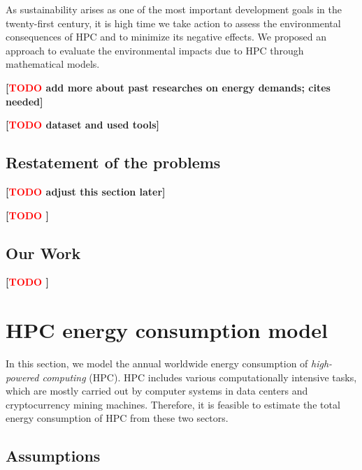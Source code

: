 \documentclass[12pt]{article}
\newcommand{\todo}[1]{\textbf{[\textcolor{red}{TODO} #1]}}
\begin{document}
As sustainability arises as one of the most important development goals in the twenty-first century, it is high time we take action to assess the environmental consequences of HPC and to minimize its negative effects. We proposed an approach to evaluate the environmental impacts due to HPC through mathematical models.

\todo{add more about past researches on energy demands; cites needed}

\todo{dataset and used tools}

\subsection{Restatement of the problems}

\todo{adjust this section later}

\todo{}

\subsection{Our Work}

\todo{}

\section{HPC energy consumption model}

In this section, we model the annual worldwide energy consumption of \textit{high-powered computing} (HPC). HPC includes various computationally intensive tasks, which are mostly carried out by computer systems in data centers and cryptocurrency mining machines. Therefore, it is feasible to estimate the total energy consumption of HPC from these two sectors.

\subsection{Assumptions}
\label{sec_energy_model_assumptions}
\end{document}
